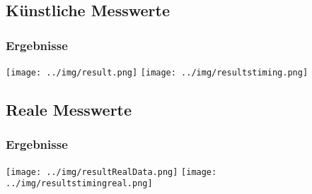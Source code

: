 \subsection{Künstliche Messwerte}
\begin{frame}
  \frametitle{Ergebnisse}
  \begin{center}
  \texttt{[image: ../img/result.png]}
  \qquad
  \texttt{[image: ../img/resultstiming.png]}
  \end{center}
\end{frame}
\subsection{Reale Messwerte}
\begin{frame}
  \frametitle{Ergebnisse}
  \begin{center}
  \texttt{[image: ../img/resultRealData.png]}
  \qquad
  \texttt{[image: ../img/resultstimingreal.png]}
  \end{center}
\end{frame}
